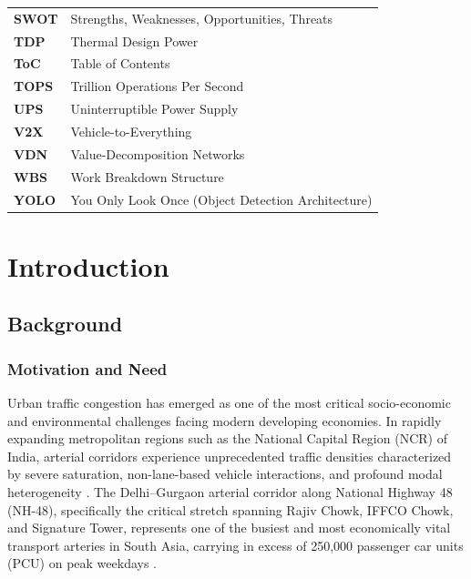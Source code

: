 \documentclass[12pt,a4paper,oneside]{report}
\begin{document}
\begin{longtable}{p{3.0cm} p{11.5cm}}
\textbf{SWOT} & Strengths, Weaknesses, Opportunities, Threats \\
\textbf{TDP} & Thermal Design Power \\
\textbf{ToC} & Table of Contents \\
\textbf{TOPS} & Trillion Operations Per Second \\
\textbf{UPS} & Uninterruptible Power Supply \\
\textbf{V2X} & Vehicle-to-Everything \\
\textbf{VDN} & Value-Decomposition Networks \\
\textbf{WBS} & Work Breakdown Structure \\
\textbf{YOLO} & You Only Look Once (Object Detection Architecture) \\
\bottomrule
\end{longtable}

\newpage

\setcounter{page}{1}

\chapter{Introduction}
\label{ch:intro}

\section{Background}
\label{sec:background}

\subsection{Motivation and Need}
Urban traffic congestion has emerged as one of the most critical socio-economic and environmental challenges facing modern developing economies. In rapidly expanding metropolitan regions such as the National Capital Region (NCR) of India, arterial corridors experience unprecedented traffic densities characterized by severe saturation, non-lane-based vehicle interactions, and profound modal heterogeneity \cite{ref_tomtom2023, ref_irc106}. The Delhi--Gurgaon arterial corridor along National Highway 48 (NH-48), specifically the critical stretch spanning Rajiv Chowk, IFFCO Chowk, and Signature Tower, represents one of the busiest and most economically vital transport arteries in South Asia, carrying in excess of 250,000 passenger car units (PCU) on peak weekdays \cite{ref_delhidataset}. 
\end{document}

